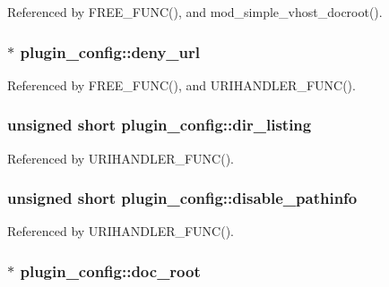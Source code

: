 Referenced by F\-R\-E\-E\-\_\-\-F\-U\-N\-C(), and mod\-\_\-simple\-\_\-vhost\-\_\-docroot().

\hypertarget{structplugin__config_a644e3ac75c5cc8c851157b93f392e7cf}{
\subsubsection[{deny\-\_\-url}]{$\ast$ plugin\-\_\-config\-::deny\-\_\-url}}\label{structplugin__config_a644e3ac75c5cc8c851157b93f392e7cf}


Referenced by F\-R\-E\-E\-\_\-\-F\-U\-N\-C(), and U\-R\-I\-H\-A\-N\-D\-L\-E\-R\-\_\-\-F\-U\-N\-C().

\hypertarget{structplugin__config_a340eeb9fec7e2eedaf7d09372a49aad6}{
\subsubsection[{dir\-\_\-listing}]{\setlength{\rightskip}{0pt plus 5cm}unsigned short plugin\-\_\-config\-::dir\-\_\-listing}}\label{structplugin__config_a340eeb9fec7e2eedaf7d09372a49aad6}


Referenced by U\-R\-I\-H\-A\-N\-D\-L\-E\-R\-\_\-\-F\-U\-N\-C().

\hypertarget{structplugin__config_ae5cd351616c243c8a02e05b7c86e9675}{
\subsubsection[{disable\-\_\-pathinfo}]{\setlength{\rightskip}{0pt plus 5cm}unsigned short plugin\-\_\-config\-::disable\-\_\-pathinfo}}\label{structplugin__config_ae5cd351616c243c8a02e05b7c86e9675}


Referenced by U\-R\-I\-H\-A\-N\-D\-L\-E\-R\-\_\-\-F\-U\-N\-C().

\hypertarget{structplugin__config_a8ba5a42020918c4727aacac451f3e720}{
\subsubsection[{doc\-\_\-root}]{$\ast$ plugin\-\_\-config\-::doc\-\_\-root}}\label{structplugin__config_a8ba5a42020918c4727aacac451f3e720}



